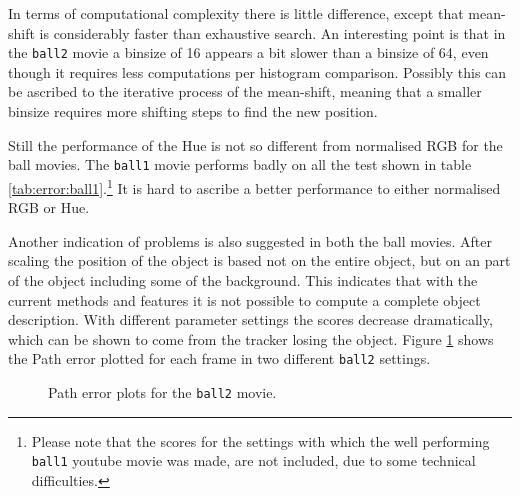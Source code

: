 \documentclass[a4paper,11pt]{article}
\begin{document}
In terms of computational complexity there is little difference, except that mean-shift is considerably faster than exhaustive search.
An interesting point is that in the \texttt{ball2} movie a binsize of 16 appears a bit slower than a binsize of 64, even though it requires less computations per histogram comparison.
Possibly this can be ascribed to the iterative process of the mean-shift, meaning that a smaller binsize requires more shifting steps to find the new position.

Still the performance of the Hue is not so different from normalised RGB for the ball movies.
The \texttt{ball1} movie performs badly on all the test shown in table \ref{tab:error:ball1}.\footnote{Please note that the scores for the settings with which the well performing \texttt{ball1} youtube movie was made, are not included, due to some technical difficulties.}
It is hard to ascribe a better performance to either normalised RGB or Hue.

Another indication of problems is also suggested in both the ball movies.
After scaling the position of the object is based not on the entire object, but on an part of the object including some of the background.
This indicates that with the current methods and features it is not possible to compute a complete object description.
With different parameter settings the scores decrease dramatically, which can be shown to come from the tracker losing the object.
Figure \ref{fig:ballgraphs} shows the Path error plotted for each frame in two different \texttt{ball2} settings.

\begin{figure}[ht]
  \centering
  \caption{Path error plots for the \texttt{ball2} movie.}
  \label{fig:ballgraphs}
\end{figure}
\end{document}
